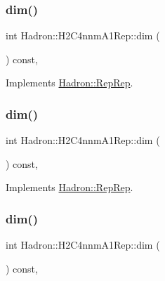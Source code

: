 \subsubsection{\texorpdfstring{dim()}{dim()}\hspace{0.1cm}{\footnotesize\ttfamily [3/5]}}
{\footnotesize\ttfamily int Hadron\+::\+H2\+C4nnm\+A1\+Rep\+::dim (\begin{DoxyParamCaption}{ }\end{DoxyParamCaption}) const\hspace{0.3cm}{\ttfamily [inline]}, {\ttfamily [virtual]}}



Implements \mbox{\hyperlink{structHadron_1_1RepRep_a92c8802e5ed7afd7da43ccfd5b7cd92b}{Hadron\+::\+Rep\+Rep}}.

\mbox{\label{structHadron_1_1H2C4nnmA1Rep_a228e6f48d234472be551bebef00ece06}} 
\subsubsection{\texorpdfstring{dim()}{dim()}\hspace{0.1cm}{\footnotesize\ttfamily [4/5]}}
{\footnotesize\ttfamily int Hadron\+::\+H2\+C4nnm\+A1\+Rep\+::dim (\begin{DoxyParamCaption}{ }\end{DoxyParamCaption}) const\hspace{0.3cm}{\ttfamily [inline]}, {\ttfamily [virtual]}}



Implements \mbox{\hyperlink{structHadron_1_1RepRep_a92c8802e5ed7afd7da43ccfd5b7cd92b}{Hadron\+::\+Rep\+Rep}}.

\mbox{\label{structHadron_1_1H2C4nnmA1Rep_a228e6f48d234472be551bebef00ece06}} 
\subsubsection{\texorpdfstring{dim()}{dim()}\hspace{0.1cm}{\footnotesize\ttfamily [5/5]}}
{\footnotesize\ttfamily int Hadron\+::\+H2\+C4nnm\+A1\+Rep\+::dim (\begin{DoxyParamCaption}{ }\end{DoxyParamCaption}) const\hspace{0.3cm}{\ttfamily [inline]}, {\ttfamily [virtual]}}



